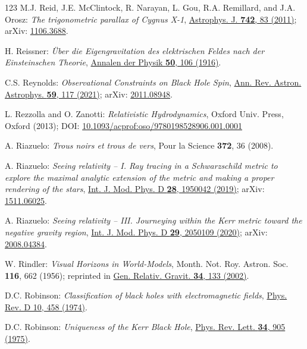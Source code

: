 \begin{thebibliography}{123}
M.J. Reid, J.E. McClintock, R. Narayan, L. Gou, R.A. Remillard, and J.A. Orosz:
{\em The trigonometric parallax of Cygnus X-1},
\href{https://doi.org/10.1088/0004-637X/742/2/83}{Astrophys. J. {\bf 742}, 83 (2011)};
arXiv: \href{https://arxiv.org/abs/1106.3688}{1106.3688}.

H. Reissner:
{\em Über die Eigengravitation des elektrischen Feldes nach der Einsteinschen Theorie},
\href{https://doi.org/10.1002/andp.19163550905}{Annalen der Physik {\bf 50}, 106 (1916)}.

C.S. Reynolds:
{\em Observational Constraints on Black Hole Spin},
\href{https://doi.org/10.1146/annurev-astro-112420-035022}{Ann. Rev. Astron. Astrophys. {\bf 59}, 117 (2021)};
arXiv: \href{https://arxiv.org/abs/2011.08948}{2011.08948}.

L. Rezzolla and O. Zanotti:
{\em Relativistic Hydrodynamics},
Oxford Univ. Press, Oxford (2013);
DOI: \href{https://doi.org/10.1093/acprof:oso/9780198528906.001.0001}{10.1093/acprof:oso/9780198528906.001.0001}

A. Riazuelo:
{\em Trous noirs et trous de vers},
Pour la Science {\bf 372}, 36 (2008).

A. Riazuelo:
{\em Seeing relativity -- I. Ray tracing in a Schwarzschild metric to explore the maximal analytic extension of the metric and making a proper rendering of the stars},
\href{https://doi.org/10.1142/S0218271819500421}{Int. J. Mod. Phys. D {\bf 28}, 1950042 (2019)};
arXiv: \href{https://arxiv.org/abs/1511.06025}{1511.06025}.

A. Riazuelo:
{\em Seeing relativity -- III. Journeying within the Kerr metric toward the negative gravity region},
\href{https://doi.org/10.1142/S0218271820501096}{Int. J. Mod. Phys. D {\bf 29}, 2050109 (2020)};
arXiv: \href{https://arxiv.org/abs/2008.04384}{2008.04384}.

W. Rindler: {\em Visual Horizons in World-Models},
Month. Not. Roy. Astron. Soc. {\bf 116}, 662 (1956);
reprinted in
\href{https://doi.org/10.1023/A:1015347106729}{Gen. Relativ. Gravit. {\bf 34}, 133 (2002)}.

D.C. Robinson:
{\em Classification of black holes with electromagnetic fields},
\href{https://doi.org/10.1103/PhysRevD.10.458}{Phys. Rev. D 10, 458 (1974)}.

D.C. Robinson:
{\em Uniqueness of the Kerr Black Hole},
\href{https://doi.org/10.1103/PhysRevLett.34.905}{Phys. Rev. Lett. {\bf 34}, 905 (1975)}.


\end{thebibliography}
